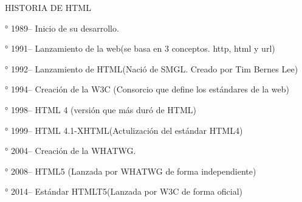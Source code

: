 HISTORIA DE HTML


° 1989-- Inicio de su desarrollo.


° 1991-- Lanzamiento de la web(se basa en 3 conceptos. http, html y url)


° 1992-- Lanzamiento de HTML(Nació de SMGL. Creado por Tim Bernes Lee)


° 1994-- Creación de la W3C (Consorcio que define los estándares de la web)


° 1998-- HTML 4 (versión que más duró de HTML) 


° 1999-- HTML 4.1-XHTML(Actulización del estándar HTML4)


° 2004-- Creación de la WHATWG.


° 2008-- HTML5 (Lanzada por WHATWG de forma independiente)


° 2014-- Estándar HTMLT5(Lanzada por W3C de forma oficial)
